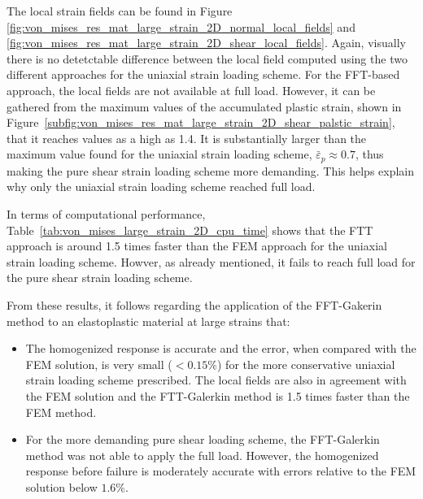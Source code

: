 The local strain fields can be found in Figure \ref{fig:von_mises_res_mat_large_strain_2D_normal_local_fields} and \ref{fig:von_mises_res_mat_large_strain_2D_shear_local_fields}.
Again, visually there is no detetctable difference between the local field computed using the two different approaches for the uniaxial strain loading scheme.
For the FFT-based approach, the local fields are not available at full load.
However, it can be gathered from the maximum values of the accumulated plastic strain, shown in Figure~\ref{subfig:von_mises_res_mat_large_strain_2D_shear_palstic_strain}, that it reaches values as a high as 1.4.
It is  substantially larger than the maximum value found for the uniaxial strain loading scheme, \(\bar{\varepsilon}_p\approx 0.7\), thus making the pure shear strain loading scheme more demanding.
This helps explain why only the uniaxial strain loading scheme reached full load.

In terms of computational performance, Table~\ref{tab:von_mises_large_strain_2D_cpu_time} shows that the FTT approach is around 1.5 times faster than the FEM approach for the uniaxial strain loading scheme.
Howver, as already mentioned, it fails to reach full load for the pure shear strain loading scheme.

From these results, it follows regarding the application of the FFT-Gakerin method to an elastoplastic material at large strains that:
\begin{itemize}
  \item The homogenized response is accurate and the error, when compared with the FEM solution, is very small (\(<0.15\%\)) for the more conservative uniaxial strain loading scheme prescribed.
  The local fields are also in agreement with the FEM solution and the FTT-Galerkin method is 1.5 times faster than the FEM method.
  \item For the more demanding pure shear loading scheme, the FFT-Galerkin method was not able to apply the full load.
  However, the homogenized response before failure is moderately accurate with errors relative to the FEM solution below \(1.6\%\).
\end{itemize}

